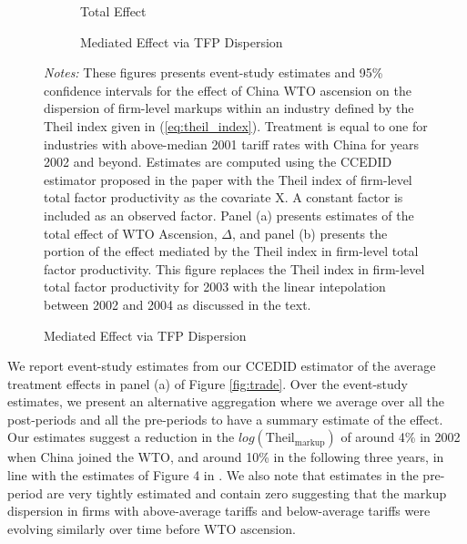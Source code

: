 \documentclass[12pt,fleqn]{article}
\makeatletter
\let\@@input
\makeatother
\begin{document}
\begin{figure}
    \caption{China WTO Ascension and Markup Dispersion (with 2003 Interpolated)}
    \label{fig:trade_interpolation}

    \begin{subfigure}[b]{\textwidth}
        \caption{Total Effect}
        
    \end{subfigure}
    
    \begin{subfigure}[b]{\textwidth}
        \caption{Mediated Effect via TFP Dispersion}
        
    \end{subfigure}
    
    {\footnotesize\emph{Notes:} These figures presents event-study estimates and 95\% confidence intervals for the effect of China WTO ascension on the dispersion of firm-level markups within an industry defined by the Theil index given in (\ref{eq:theil_index}). Treatment is equal to one for industries with above-median 2001 tariff rates with China for years 2002 and beyond. Estimates are computed using the CCEDID estimator proposed in the paper with the Theil index of firm-level total factor productivity as the covariate X. A constant factor is included as an observed factor. Panel (a) presents estimates of the total effect of WTO Ascension, $\Delta$, and panel (b) presents the portion of the effect mediated by the Theil index in firm-level total factor productivity. This figure replaces the Theil index in firm-level total factor productivity for 2003 with the linear intepolation between 2002 and 2004 as discussed in the text.}
\end{figure}

We report event-study estimates from our CCEDID estimator of the average treatment effects in panel (a) of Figure \ref{fig:trade}. Over the event-study estimates, we present an alternative aggregation where we average over all the post-periods and all the pre-periods to have a summary estimate of the effect. Our estimates suggest a reduction in the $log(\text{Theil}_{\text{markup}})$ of around 4\% in 2002 when China joined the WTO, and around 10\% in the following three years, in line with the estimates of Figure 4 in \citet{lu2015trade}. We also note that estimates in the pre-period are very tightly estimated and contain zero suggesting that the markup dispersion in firms with above-average tariffs and below-average tariffs were evolving similarly over time before WTO ascension. 
\end{document}
